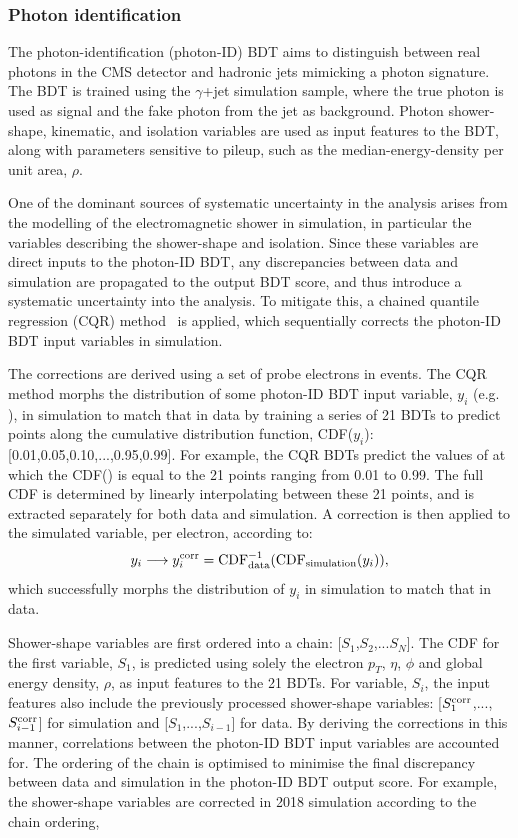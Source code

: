 \subsubsection{Photon identification}
The photon-identification (photon-ID) BDT aims to distinguish between real photons in the CMS detector and hadronic jets mimicking a photon signature. The BDT is trained using the $\gamma$+jet simulation sample, where the true photon is used as signal and the fake photon from the jet as background. Photon shower-shape, kinematic, and isolation variables are used as input features to the BDT, along with parameters sensitive to pileup, such as the median-energy-density per unit area, $\rho$. 

One of the dominant sources of systematic uncertainty in the \Hgg analysis arises from the modelling of the electromagnetic shower in simulation, in particular the variables describing the shower-shape and isolation. Since these variables are direct inputs to the photon-ID BDT, any discrepancies between data and simulation are propagated to the output BDT score, and thus introduce a systematic uncertainty into the analysis. To mitigate this, a chained quantile regression (CQR) method~\cite{CQR} is applied, which sequentially corrects the photon-ID BDT input variables in simulation. 

The corrections are derived using a set of probe electrons in \Zee events. The CQR method morphs the distribution of some photon-ID BDT input variable, $y_i$ (e.g. \RNINE), in simulation to match that in data by training a series of 21 BDTs to predict points along the cumulative distribution function, CDF($y_i$): [0.01,0.05,0.10,...,0.95,0.99]. For example, the CQR BDTs predict the values of \RNINE at which the CDF(\RNINE) is equal to the 21 points ranging from 0.01 to 0.99. The full CDF is determined by linearly interpolating between these 21 points, and is extracted separately for both data and simulation. A correction is then applied to the simulated variable, per electron, according to:
\begin{equation}
    y_i \longrightarrow y_i^{\rm{corr}} = {\rm{CDF}}^{-1}_{\rm{data}}({\rm{CDF}}_{\rm{simulation}}(y_i)),
\end{equation}
\noindent 
which successfully morphs the distribution of $y_i$ in simulation to match that in data. 

Shower-shape variables are first ordered into a chain: [$S_1$,$S_2$,...$S_N$]. The CDF for the first variable, $S_1$, is predicted using solely the electron $p_T$, $\eta$, $\phi$ and global energy density, $\rho$, as input features to the 21 BDTs. For variable, $S_i$, the input features also include the previously processed shower-shape variables: [$S^{\rm{corr}}_1$,...,$S^{\rm{corr}}_{i-1}$] for simulation and [$S_1$,...,$S_{i-1}$] for data. By deriving the corrections in this manner, correlations between the photon-ID BDT input variables are accounted for. The ordering of the chain is optimised to minimise the final discrepancy between data and simulation in the photon-ID BDT output score. For example, the shower-shape variables are corrected in 2018 simulation according to the chain ordering,

